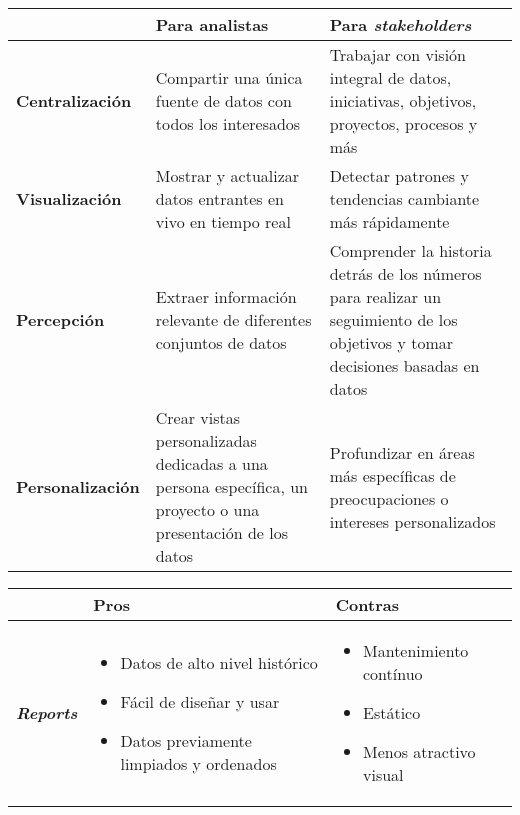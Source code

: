 \begin{itemize}
{\begin{itemize}
{\begin{itemize}
\begin{table}
\begin{tabular}{|p{2.5cm}|p{6.5cm}|p{6.5cm}|}
            \hline
             & \textbf{Para analistas} & \textbf{Para \textit{stakeholders}} \\
            \hline
            \small{\textbf{Centralización}} & Compartir una única fuente de datos con todos los interesados & Trabajar con visión integral de datos, iniciativas, objetivos, proyectos, procesos y más \\
            \hline
            \small{\textbf{Visualización}} & Mostrar y actualizar datos entrantes en vivo en tiempo real & Detectar patrones y tendencias cambiante más rápidamente \\
            \hline
            \small{\textbf{Percepción}} & Extraer información relevante de diferentes conjuntos de datos & Comprender la historia detrás de los números para realizar un seguimiento de los objetivos y tomar decisiones basadas en datos \\
            \hline
            \small{\textbf{Personalización}} & Crear vistas personalizadas dedicadas a una persona específica, un proyecto o una presentación de los datos & Profundizar en áreas más específicas de preocupaciones o intereses personalizados \\
            \hline
        \end{tabular}
    \end{table}
        \end{itemize}}
        \begin{table}
        \centering
        \begin{tabular}{|p{2cm}|p{6cm}|p{6cm}|}
            \hline
            & \textbf{Pros} & \textbf{Contras} \\
            \hline
            \small{\textbf{\textit{Reports}}} & \begin{itemize}
                \item {Datos de alto nivel histórico}
                \item {Fácil de diseñar y usar}
                \item {Datos previamente limpiados y ordenados}
            \end{itemize} & \begin{itemize}
                \item {Mantenimiento contínuo}
                \item {Estático}
                \item {Menos atractivo visual}
            \end{itemize} \\
            \hline

\end{tabular}
\end{table}
\end{itemize}}
\end{itemize}
